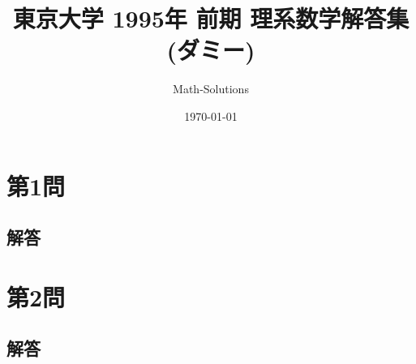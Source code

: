 \documentclass[a4paper,11pt]{ltjsarticle}
\title{東京大学 1995年 前期 理系数学解答集 (ダミー)}
\author{Math-Solutions}
\date{\today}
\begin{document}
\maketitle
\clearpage

\section*{第1問}

\subsection*{解答}

\clearpage %

\section*{第2問}

\subsection*{解答}

\clearpage %
\end{document}
